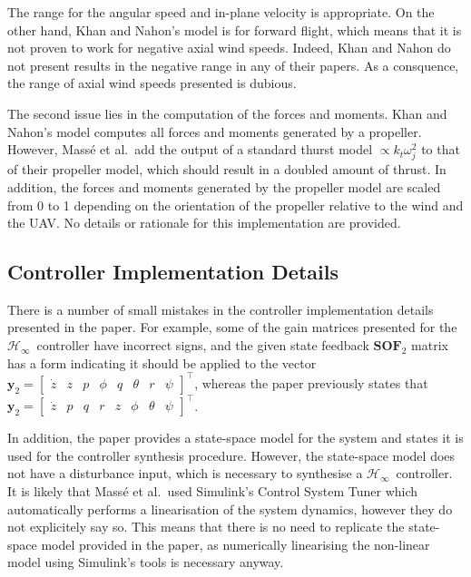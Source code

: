 \documentclass[a4paper,12pt]{article}
\newcommand{\hinf}{\mathcal{H}_\infty}
\newcommand{\Hinf}{\(\hinf\)}
\begin{document}
            The range for the angular speed and in-plane velocity is appropriate. On the other hand, Khan and Nahon's model is for forward flight, which means that it is not proven to work for negative axial wind speeds. Indeed, Khan and Nahon do not present results in the negative range in any of their papers. As a consquence, the range of axial wind speeds presented is dubious.

            The second issue lies in the computation of the forces and moments. Khan and Nahon's model computes all forces and moments generated by a propeller. However, Mass{\'e} et al.\ add the output of a standard thurst model \(\propto k_t \omega_j^2\) to that of their propeller model, which should result in a doubled amount of thrust. In addition, the forces and moments generated by the propeller model are scaled from 0 to 1 depending on the orientation of the propeller relative to the wind and the UAV. No details or rationale for this implementation are provided.

        \subsection{Controller Implementation Details}
        
            There is a number of small mistakes in the controller implementation details presented in the paper. For example, some of the gain matrices presented for the \Hinf\ controller have incorrect signs, and the given state feedback \(\mathbf{SOF}_2\) matrix has a form indicating it should be applied to the vector \(\mathbf{y}_2 = \begin{bmatrix} \dot{z} & z & p & \phi & q & \theta & r & \psi \end{bmatrix}^\top\), whereas the paper previously states that \(\mathbf{y}_2 = \begin{bmatrix} \dot{z} & p & q & r & z & \phi & \theta & \psi \end{bmatrix}^\top\).

            In addition, the paper provides a state-space model for the system and states it is used for the controller synthesis procedure. However, the state-space model does not have a disturbance input, which is necessary to synthesise a \Hinf\ controller. It is likely that Mass{\'e} et al.\ used Simulink's Control System Tuner which automatically performs a linearisation of the system dynamics, however they do not explicitely say so. This means that there is no need to replicate the state-space model provided in the paper, as numerically linearising the non-linear model using Simulink's tools is necessary anyway.

    
    
\end{document}
